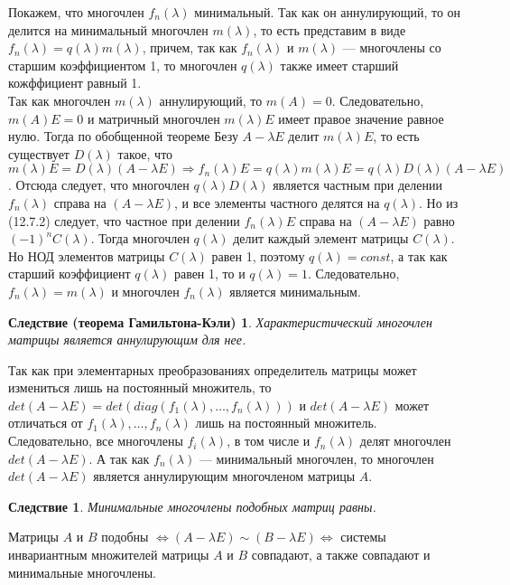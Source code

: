 \begin{Proof}
	Покажем, что многочлен $f_n(\lambda)$ минимальный. Так как он аннулирующий, то он делится на минимальный многочлен $m(\lambda)$, то есть представим в виде $f_n(\lambda) = q(\lambda) m(\lambda)$, причем, так как $f_n(\lambda)$ и $m(\lambda)$ --- многочлены со старшим коэффициентом 1, то многочлен $q(\lambda)$ также имеет старший кожффициент равный 1.\\
	Так как многочлен $m(\lambda)$ аннулирующий, то $m(A) = 0$. Следовательно, $m(A)E = 0$ и матричный многочлен $m(\lambda)E$ имеет правое значение равное нулю. Тогда по обобщенной теореме Безу $A-\lambda E$ делит $m(\lambda)E$, то есть существует $D(\lambda)$ такое, что $m(\lambda)E = D(\lambda)(A-\lambda E)\Rightarrow f_n(\lambda) E = q(\lambda) m(\lambda) E =q(\lambda)D(\lambda)(A-\lambda E)$. Отсюда следует, что многочлен $q(\lambda) D(\lambda)$ является частным при делении $f_n(\lambda)$ справа на $(A-\lambda E)$, и все элементы частного делятся на $q(\lambda)$. Но из (12.7.2) следует, что частное при делении $f_n(\lambda)E$ справа на $(A-\lambda E)$ равно $(-1)^nC(\lambda)$. Тогда многочлен $q(\lambda)$ делит каждый элемент матрицы $C(\lambda)$. Но НОД элементов матрицы $C(\lambda)$ равен 1, поэтому $q(\lambda) = const$, а так как старший коэффициент $q(\lambda)$ равен 1, то и $q(\lambda) = 1$. Следовательно, $f_n(\lambda) = m(\lambda)$ и многочлен $f_n(\lambda)$ является минимальным.
\end{Proof}
\newtheorem*{cor12_7_1}{Следствие (теорема Гамильтона-Кэли)}\begin{cor12_7_1}Характеристический многочлен матрицы является аннулирующим для нее.
\end{cor12_7_1}\begin{Proof}
	Так как при элементарных преобразованиях определитель матрицы может измениться лишь на постоянный множитель, то $det(A-\lambda E) = det(diag(f_1(\lambda),\dots, f_n(\lambda)))$ и $det(A-\lambda E)$ может отличаться от $f_1(\lambda),\dots, f_n(\lambda)$ лишь на постоянный множитель. Следовательно, все многочлены $f_i(\lambda)$, в том числе и $f_n(\lambda)$ делят многочлен $det(A-\lambda E)$. А так как $f_n(\lambda)$ --- минимальный многочлен, то многочлен $det(A-\lambda E)$ является аннулирующим многочленом матрицы $A$.
\end{Proof}
\newtheorem*{cor12_7_2}{Следствие}\begin{cor12_7_2}Минимальные многочлены подобных матриц равны.
\end{cor12_7_2}\begin{Proof}
	Матрицы $A$ и $B$ подобны $\Longleftrightarrow (A - \lambda E) \sim (B - \lambda E) \Longleftrightarrow$ системы инвариантным множителей матрицы $A$ и $B$ совпадают, а также совпадают и минимальные многочлены.
\end{Proof}






